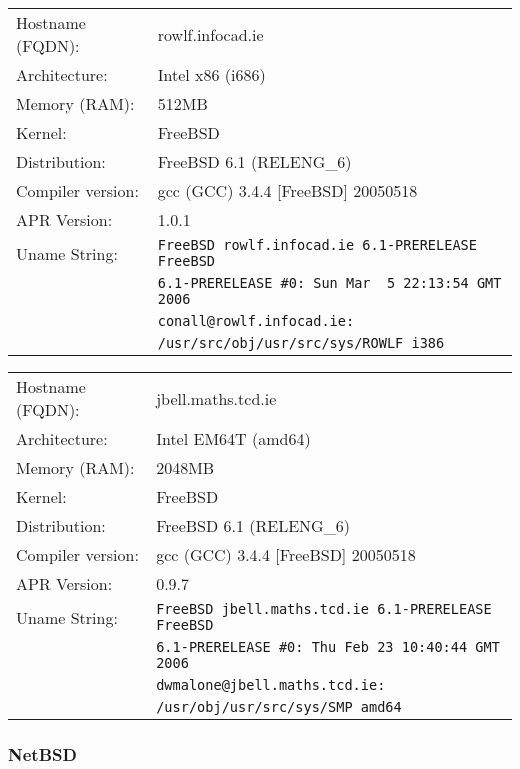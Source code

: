 \begin{tabular}{ll}
Hostname (FQDN):	&	rowlf.infocad.ie 					\\
Architecture:		&	Intel x86 (i686)					\\
Memory (RAM):		&	512MB									\\
Kernel:				&	FreeBSD								\\
Distribution:		&	FreeBSD 6.1 (RELENG\_6)			\\
Compiler version:	&	gcc (GCC) 3.4.4 [FreeBSD] 20050518	\\
APR Version:		&	1.0.1									\\
Uname String:		& \verb!FreeBSD rowlf.infocad.ie 6.1-PRERELEASE FreeBSD!\\
						& \verb!6.1-PRERELEASE #0: Sun Mar  5 22:13:54 GMT 2006!\\
						& \verb!conall@rowlf.infocad.ie:! \\
						& \verb!/usr/src/obj/usr/src/sys/ROWLF i386! \\
\end{tabular}

\begin{tabular}{ll}
Hostname (FQDN):	&	jbell.maths.tcd.ie 				\\
Architecture:		&	Intel EM64T (amd64)				\\
Memory (RAM):		&	2048MB								\\
Kernel:				&	FreeBSD								\\
Distribution:		&	FreeBSD 6.1 (RELENG\_6)			\\
Compiler version:	&	gcc (GCC) 3.4.4 [FreeBSD] 20050518\\
APR Version:		&	0.9.7									\\
Uname String:		& \verb!FreeBSD jbell.maths.tcd.ie 6.1-PRERELEASE FreeBSD!\\
						& \verb!6.1-PRERELEASE #0: Thu Feb 23 10:40:44 GMT 2006! \\
						& \verb!dwmalone@jbell.maths.tcd.ie:!\\
						& \verb!/usr/obj/usr/src/sys/SMP amd64! \\
\end{tabular}

\subsubsection{NetBSD}

